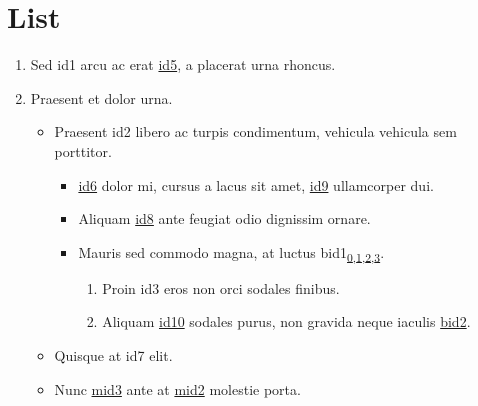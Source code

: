 \section{List}
\label{\detokenize{test:list}}\begin{enumerate}
%
\item {} 
\sphinxAtStartPar
Sed \hypertarget{\detokenize{id1}}{id1} arcu ac erat \hyperlink{\detokenize{id5}}{id5}, a placerat urna rhoncus.

\item {} 
\sphinxAtStartPar
Praesent et dolor urna.
\begin{itemize}
\item {} 
\sphinxAtStartPar
Praesent \hypertarget{\detokenize{id2}}{id2} libero ac turpis condimentum, vehicula vehicula sem porttitor.
\begin{itemize}
\item {} 
\sphinxAtStartPar
\hyperlink{\detokenize{id6}}{id6} dolor mi, cursus a lacus sit amet, \hyperlink{\detokenize{id9}}{id9} ullamcorper dui.

\item {} 
\sphinxAtStartPar
Aliquam \hyperlink{\detokenize{id8}}{id8} ante feugiat odio dignissim ornare.

\item {} 
\sphinxAtStartPar
Mauris sed commodo magna, at luctus \hypertarget{\detokenize{bid1}}{bid1}\texorpdfstring{\textsubscript{\hyperlink{\detokenize{bid1-ref4}}{0},\hyperlink{\detokenize{bid1-ref20}}{1},\hyperlink{\detokenize{bid1-ref28}}{2},\hyperlink{\detokenize{bid1-ref38}}{3}}}{}.
\begin{enumerate}
%
\item {} 
\sphinxAtStartPar
Proin \hypertarget{\detokenize{id3}}{id3} eros non orci sodales finibus.

\item {} 
\sphinxAtStartPar
Aliquam \hyperlink{\detokenize{id10}}{id10} sodales purus, non gravida neque iaculis \hyperlink{\detokenize{bid2}}{\hypertarget{\detokenize{bid2-ref15}}{bid2}}.

\end{enumerate}

\end{itemize}

\item {} 
\sphinxAtStartPar
Quisque at \hypertarget{\detokenize{id7}}{id7} elit.

\item {} 
\sphinxAtStartPar
Nunc \hyperlink{\detokenize{test-mid3-id1}}{\hypertarget{\detokenize{test-mid3-id0}}{mid3}} ante at \hyperlink{\detokenize{test-mid2-id0}}{\hypertarget{\detokenize{test-mid2-id1}}{mid2}} molestie porta.


\end{itemize}
\end{enumerate}
